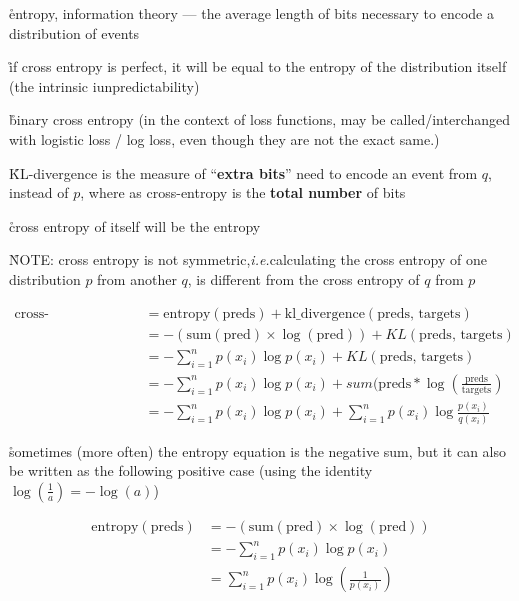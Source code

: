 \r{entropy, information theory --- the average length of bits necessary to encode a distribution of events}

\r{if cross entropy is perfect, it will be equal to the entropy of the distribution itself (the intrinsic iunpredictability)}

\r{binary cross entropy (in the context of loss functions, may be called/interchanged with logistic loss / log loss, even though they are not the exact same.)}

\r{KL-divergence is the measure of ``\textbf{extra bits}'' need to encode an event from $q$, instead of $p$, where as cross-entropy is the \textbf{total number} of bits}

\r{cross entropy of itself will be the entropy}

\r{NOTE: cross entropy is not symmetric,\textit{i.e.}calculating the cross entropy of one distribution $p$ from another $q$, is different from the cross entropy of $q$ from $p$}





\begin{equation}
	\begin{split}
		\textrm{cross-entropy(preds, targets) } & =  \textrm{entropy} (\textrm{preds}) + \textrm{kl\_divergence}(\textrm{preds, targets})\\
		& = -(\textrm{sum}(\textrm{pred}) \times \log (\textrm{pred}) )+ KL(\textrm{preds, targets})\\
		& =  -\sum_{i=1}^{n}p(x_i)\log p(x_i)+ KL(\textrm{preds, targets}) \\
		& =  -\sum_{i=1}^{n}p(x_i)\log p(x_i)+ sum(\textrm{preds} * \log ( \frac{\textrm{preds}}{\textrm{targets}} ) \\
		& =  -\sum_{i=1}^{n}p(x_i)\log p(x_i)+ \sum_{i=1}^{n}p(x_i)\log \frac{p(x_i)}{q(x_i)} 
	\end{split}
\end{equation}

\r{sometimes (more often) the entropy equation is the negative sum, but it can also be written as the following positive case (using the identity $ \log ( \frac{1}{a} )  = - \log (a) $)}

\begin{equation}
	\begin{split}
		\textrm{entropy} (\textrm{preds})  & =  -(\textrm{sum}(\textrm{pred}) \times \log (\textrm{pred}) )\\
		& = - \sum_{i=1}^{n}p(x_i)\log p(x_i) \\
		& =   \sum_{i=1}^{n}p(x_i)\log ( \frac{1}{p(x_i) } )
	\end{split}
\end{equation}



